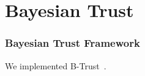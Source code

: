 \section{Bayesian Trust}
\begin{frame}
\frametitle{Bayesian Trust Framework}

We implemented B-Trust~\citep*{btrust}.

\end{frame}